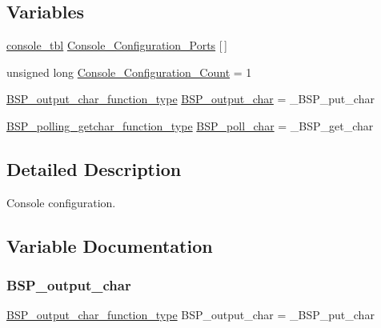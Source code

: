\subsection*{Variables}
\begin{DoxyCompactItemize}
\item 
\mbox{\hyperlink{struct__console__tbl}{console\+\_\+tbl}} \mbox{\hyperlink{arm_2beagle_2console_2console-config_8c_a8d1404b49209c3692a3dc1433710e550}{Console\+\_\+\+Configuration\+\_\+\+Ports}} \mbox{[}$\,$\mbox{]}
\item 
unsigned long \mbox{\hyperlink{arm_2beagle_2console_2console-config_8c_a59f0ae8f9904bd193825ccfc2c99aeb6}{Console\+\_\+\+Configuration\+\_\+\+Count}} = 1
\item 
\mbox{\hyperlink{bspIo_8h_a0b0dff1c3d35110ae303b4098c60dc14}{B\+S\+P\+\_\+output\+\_\+char\+\_\+function\+\_\+type}} \mbox{\hyperlink{arm_2beagle_2console_2console-config_8c_a5fb8c9c4f076f0340b4a17ed432ced5c}{B\+S\+P\+\_\+output\+\_\+char}} = \+\_\+\+B\+S\+P\+\_\+put\+\_\+char
\item 
\mbox{\hyperlink{bspIo_8h_a132b9ceff428a634ece5dfaac7ef1006}{B\+S\+P\+\_\+polling\+\_\+getchar\+\_\+function\+\_\+type}} \mbox{\hyperlink{arm_2beagle_2console_2console-config_8c_ae5846eecdfa8f2813504371bf01c29b0}{B\+S\+P\+\_\+poll\+\_\+char}} = \+\_\+\+B\+S\+P\+\_\+get\+\_\+char
\end{DoxyCompactItemize}


\subsection{Detailed Description}
Console configuration. 



\subsection{Variable Documentation}
\mbox{\label{arm_2beagle_2console_2console-config_8c_a5fb8c9c4f076f0340b4a17ed432ced5c}} 
\subsubsection{\texorpdfstring{BSP\_output\_char}{BSP\_output\_char}}
{\footnotesize\ttfamily \mbox{\hyperlink{bspIo_8h_a0b0dff1c3d35110ae303b4098c60dc14}{B\+S\+P\+\_\+output\+\_\+char\+\_\+function\+\_\+type}} B\+S\+P\+\_\+output\+\_\+char = \+\_\+\+B\+S\+P\+\_\+put\+\_\+char}

